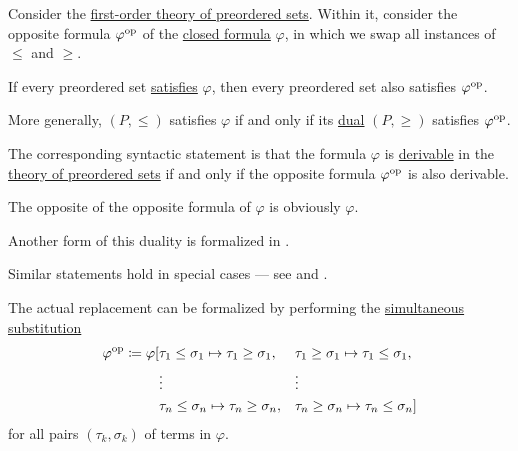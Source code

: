 \begin{theorem}\label{thm:preorder_duality}
  Consider the \hyperref[def:preordered_set/theory]{first-order theory of preordered sets}. Within it, consider the opposite formula \( \varphi^{\operatorname{op}} \) of the \hyperref[def:first_order_syntax/closed_formula]{closed formula} \( \varphi \), in which we swap all instances of \( \leq \) and \( \geq \).

  If every preordered set \hyperref[def:first_order_model]{satisfies} \( \varphi \), then every preordered set also satisfies \( \varphi^{\operatorname{op}} \).

  More generally, \( (P, \leq) \) satisfies \( \varphi \) if and only if its \hyperref[def:preordered_set/opposite]{dual} \( (P, \geq) \) satisfies \( \varphi^{\operatorname{op}} \).
\end{theorem}
\begin{comments}
  \item The corresponding syntactic statement is that the formula \( \varphi \) is \hyperref[def:proof_derivability]{derivable} in the \hyperref[def:preordered_set/theory]{theory of preordered sets} if and only if the opposite formula \( \varphi^{\operatorname{op}} \) is also derivable.

  \item The opposite of the opposite formula of \( \varphi \) is obviously \( \varphi \).

  \item Another form of this duality is formalized in .

  \item Similar statements hold in special cases --- see  and .

  \item The actual replacement can be formalized by performing the \hyperref[def:first_order_substitution/term_in_formula]{simultaneous substitution}
  \begin{equation*}
    \begin{aligned}
      \varphi^{\operatorname{op}} \coloneqq \varphi[
        &\tau_1 \leq \sigma_1 \mapsto \tau_1 \geq \sigma_1, &&\tau_1 \geq \sigma_1 \mapsto \tau_1 \leq \sigma_1, \\
        &\vdots                                       &&\vdots \\
        &\tau_n \leq \sigma_n \mapsto \tau_n \geq \sigma_n, &&\tau_n \geq \sigma_n \mapsto \tau_n \leq \sigma_n]
    \end{aligned}
  \end{equation*}
  for all pairs \( (\tau_k, \sigma_k) \) of terms in \( \varphi \).
\end{comments}
